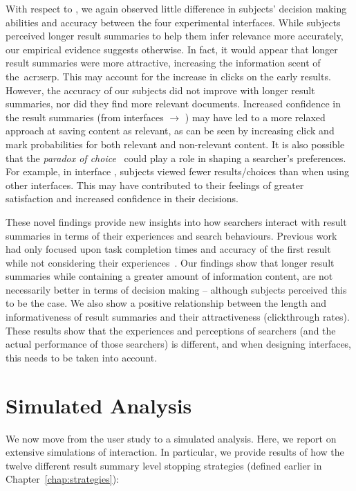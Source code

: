 With respect to , we again observed little difference in subjects' decision making abilities and accuracy between the four experimental interfaces. While subjects perceived longer result summaries to help them infer relevance more accurately, our empirical evidence suggests otherwise. In fact, it would appear that longer result summaries were more attractive, increasing the information scent of the~\gls{acr:serp}. This may account for the increase in clicks on the early results. However, the accuracy of our subjects did not improve with longer result summaries, nor did they find more relevant documents. Increased confidence in the result summaries (from interfaces  $\rightarrow$ ) may have led to a more relaxed approach at saving content as relevant, as can be seen by increasing click and mark probabilities for both relevant and non-relevant content. It is also possible that the \emph{paradox of choice}~\citep{oulasvirta2009serp_size} could play a role in shaping a searcher's preferences. For example, in interface , subjects viewed fewer results/choices than when using other interfaces. This may have contributed to their feelings of greater satisfaction and increased confidence in their decisions.

These novel findings provide new insights into how searchers interact with result summaries in terms of their experiences and search behaviours. Previous work had only focused upon task completion times and accuracy of the first result while not considering their experiences~\citep{cutrell2007eye_tracking, kaisser2008improving}. Our findings show that longer result summaries while containing a greater amount of information content, are not necessarily better in terms of decision making -- although subjects perceived this to be the case. We also show a positive relationship between the length and informativeness of result summaries and their attractiveness (clickthrough rates). These results show that the experiences and perceptions of searchers (and the actual performance of those searchers) is different, and when designing interfaces, this needs to be taken into account.

\section{Simulated Analysis}\label{sec:snippets:simulations}
We now move from the user study to a simulated analysis. Here, we report on extensive simulations of interaction. In particular, we provide results of how the twelve different result summary level stopping strategies (defined earlier in Chapter~\ref{chap:strategies}):

